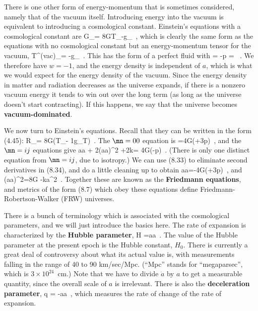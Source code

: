 \documentclass[12pt]{article}
\begin{document}
There is one other form of energy-momentum that is sometimes 
considered, namely that of the vacuum itself.  Introducing energy
into the vacuum is equivalent to introducing a cosmological constant.
Einstein's equations with a cosmological constant are
\be
  G_\mn = 8\pi GT_\mn -\Lambda g_\mn \ ,\label{8.29}
\ee
which is clearly the same form as the equations with no cosmological
constant but an energy-momentum tensor for the vacuum,
\be
  T^{\rm (vac)}_\mn = -{{\Lambda}}g_\mn\ .\label{8.30}
\ee
This has the form of a perfect fluid with
\be
  \rho = -p = {{\Lambda}}\ .\label{8.31}
\ee
We therefore have $w=-1$, and 
the energy density is independent of $a$, which is what
we would expect for the energy density of the vacuum.  Since the
energy density in matter and radiation decreases as the universe
expands, if there is a nonzero vacuum energy it tends to win out over
the long term (as long as the universe doesn't start contracting).
If this happens, we say that the universe becomes {\bf
vacuum-dominated}.

We now turn to Einstein's equations.  Recall that they can be
written in the form (4.45):
\be
  R_\mn = 8\pi G\left(T_\mn - {1}g_\mn T\right)\ .
  \label{8.32}
\ee
The $\mn = 00$ equation is
=4\pi G(\rho+3p)\ ,\label{8.33}
\ee
and the $\mn = ij$ equations give
\be
  {{\ddot a}\over a} + 2\left({{\dot a}\over a}\right)^2
  +2{k}= 4\pi G(\rho-p)\ .\label{8.34}
\ee
(There is only one distinct equation from $\mn = ij$, due to
isotropy.)  We can use (8.33) to eliminate second derivatives in
(8.34), and do a little cleaning up to obtain 
\be
  {{\ddot a}\over a}=-{{4\pi G}}(\rho+3p)\ ,\label{8.35}
\ee
and
\be
  \left({{\dot a}\over a}\right)^2={{8\pi G}}\rho
  -{{k}\over a^2}\ .\label{8.36}
\ee
Together these are known as the {\bf Friedmann equations},
and metrics of the form (8.7) which obey these equations define
Friedmann-Robertson-Walker (FRW) universes.

There is a bunch of terminology which is associated with the
cosmological parameters, and we will just introduce the basics
here.  The rate of expansion is characterized by the {\bf Hubble
parameter},
\be
  H ={{\dot a}\over a}\ .\label{8.37}
\ee
The value of the Hubble parameter at the present epoch is the
Hubble constant, $H_0$.  There is currently a great deal of 
controversy about what its actual value is, with measurements
falling in the range of 40 to 90 km/sec/Mpc.  (``Mpc'' stands for
``megaparsec'', which is $3\times 10^{24}$~cm.)  Note that we
have to divide $\dot a$ by $a$ to get a measurable quantity, since
the overall scale of $a$ is irrelevant.  There is also the
{\bf deceleration parameter},
\be
  q = -{{a\ddot a}}\ ,\label{8.38}
\ee
which measures the rate of change of the rate of expansion.
\end{document}
